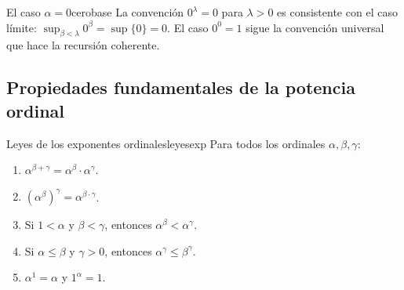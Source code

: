 \begin{observacion}{El caso $\alpha = 0$}{cerobase}
La convención $0^\lambda = 0$ para $\lambda > 0$ es consistente con el caso límite: $\sup_{\beta < \lambda} 0^\beta = \sup\{0\} = 0$. El caso $0^0 = 1$ sigue la convención universal que hace la recursión coherente.
\end{observacion}

\subsection{Propiedades fundamentales de la potencia ordinal}

\begin{proposicion}{Leyes de los exponentes ordinales}{leyesexp}
Para todos los ordinales $\alpha, \beta, \gamma$:
\begin{enumerate}[leftmargin=2em, label=(\roman*)]
  \item $\alpha^{\beta+\gamma} = \alpha^\beta \cdot \alpha^\gamma$.
  \item $(\alpha^\beta)^\gamma = \alpha^{\beta \cdot \gamma}$.
  \item Si $1 < \alpha$ y $\beta < \gamma$, entonces $\alpha^\beta < \alpha^\gamma$.
  \item Si $\alpha \leq \beta$ y $\gamma > 0$, entonces $\alpha^\gamma \leq \beta^\gamma$.
  \item $\alpha^1 = \alpha$ y $1^\alpha = 1$.
\end{enumerate}
\end{proposicion}

